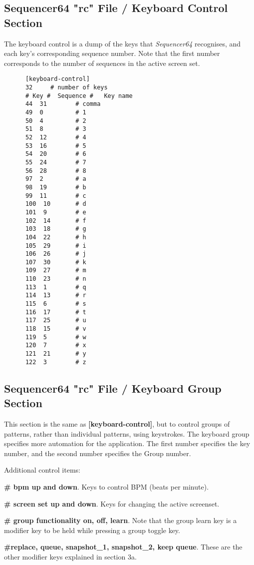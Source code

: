 \subsection{Sequencer64 "rc" File / Keyboard Control Section}
\label{subsec:seq64_rc_file_keyboard_control}
        
   The keyboard control is a dump of the keys that \textsl{Sequencer64}
   recognises, and each key's corresponding sequence number.
   Note that the first number corresponds to the number of sequences in
   the active screen set.

   \begin{verbatim}
      [keyboard-control]
      32     # number of keys
      # Key #  Sequence #   Key name
      44  31        # comma
      49  0         # 1
      50  4         # 2
      51  8         # 3
      52  12        # 4
      53  16        # 5
      54  20        # 6
      55  24        # 7
      56  28        # 8
      97  2         # a
      98  19        # b
      99  11        # c
      100  10       # d
      101  9        # e
      102  14       # f
      103  18       # g
      104  22       # h
      105  29       # i
      106  26       # j
      107  30       # k
      109  27       # m
      110  23       # n
      113  1        # q
      114  13       # r
      115  6        # s
      116  17       # t
      117  25       # u
      118  15       # v
      119  5        # w
      120  7        # x
      121  21       # y
      122  3        # z
   \end{verbatim}

\subsection{Sequencer64 "rc" File / Keyboard Group Section}
\label{subsec:seq64_rc_file_keyboard_group}

   This section is the same as
   \textbf{[keyboard-control]}, but to control groups of patterns, rather than
   individual patterns, using keystrokes.
   The keyboard group specifies more automation for the application.  The
   first number specifies the key number, and the second number specifies
   the Group number.

   Additional control items:

   \begin{enumber}
      \item \textbf{\# bpm up and down}.
         Keys to control BPM (beats per minute).
      \item \textbf{\# screen set up and down}.
         Keys for changing the active screenset.
      \item \textbf{\# group functionality on, off, learn}.
         Note that the group learn key is a modifier key to be held while 
         pressing a group toggle key.
      \item \textbf{\#replace, queue, snapshot\_1, snapshot\_2, keep queue}.
         These are the other modifier keys explained in section 3a.
   \end{enumber}

